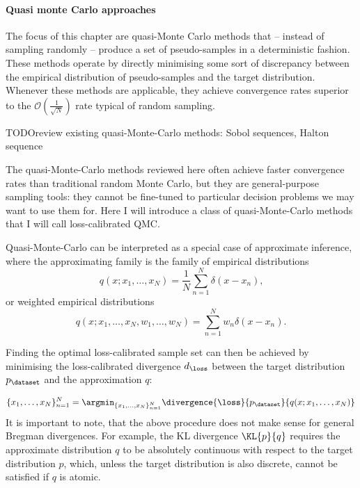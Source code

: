 
\paragraph{Quasi monte Carlo approaches}

 The focus of this chapter are quasi-Monte Carlo methods that -- instead of sampling randomly -- produce a set of pseudo-samples in a deterministic fashion. These methods operate by directly minimising some sort of discrepancy between the empirical distribution of pseudo-samples and the target distribution. Whenever these methods are applicable, they achieve convergence rates superior to the $\mathcal{O}(\frac{1}{\sqrt{N}})$ rate typical of random sampling.

TODO{review existing quasi-Monte-Carlo methods: Sobol sequences, Halton sequence}

	The quasi-Monte-Carlo methods reviewed here often achieve faster convergence rates than traditional random Monte Carlo, but they are general-purpose sampling tools: they cannot be fine-tuned to particular decision problems we may want to use them for. Here I will introduce a class of quasi-Monte-Carlo methods that I will call loss-calibrated QMC. 

	Quasi-Monte-Carlo can be interpreted as a special case of approximate inference, where the approximating family is the family of empirical distributions
	\begin{equation}
		q(x ; x_1,\ldots,x_N) = \frac{1}{N} \sum_{n=1}^{N} \delta(x - x_n)\mbox{,}
	\end{equation}
	or weighted empirical distributions
	\begin{equation}
	q(x ; x_1,\ldots,x_N,w_1,\ldots,w_N) = \sum_{n=1}^{N} w_n \delta(x - x_n)\mbox{.}
\end{equation}

Finding the optimal loss-calibrated sample set can then be achieved by minimising the loss-calibrated divergence $d_\loss$ between the target distribution $p_\dataset$ and the approximation $q$:

\begin{equation}
	\{x_1,\ldots,x_N\}_{n=1}^{N} = \argmin_{\{x_1,\ldots,x_N\}_{n=1}^{N}} \divergence{\loss}{p_\dataset}{q(x ; x_1,\ldots,x_N)} \label{eqn:loss_calibrated_nonsequential}
\end{equation}
It is important to note, that the above procedure does not make sense for general Bregman divergences. For example, the KL divergence $\KL{p}{q}$ requires the approximate distribution $q$ to be absolutely continuous with respect to the target distribution $p$, which, unless the target distribution is also discrete, cannot be satisfied if $q$ is atomic.

